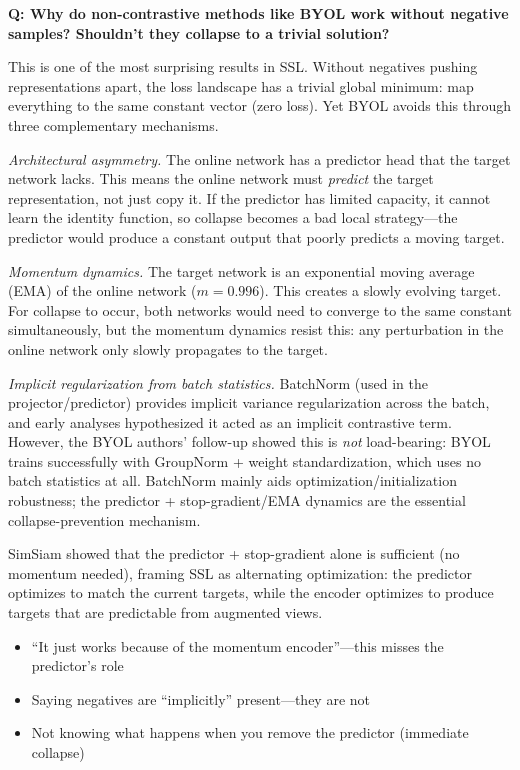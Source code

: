 \begin{interviewq}
\textbf{Q: Why do non-contrastive methods like BYOL work without negative samples? Shouldn't they collapse to a trivial solution?}

 \quad {} \quad \badgefreq{\freqhigh}

\stronganswer This is one of the most surprising results in SSL. Without negatives pushing representations apart, the loss landscape has a trivial global minimum: map everything to the same constant vector (zero loss). Yet BYOL avoids this through three complementary mechanisms.

\textit{Architectural asymmetry.} The online network has a predictor head that the target network lacks. This means the online network must \textit{predict} the target representation, not just copy it. If the predictor has limited capacity, it cannot learn the identity function, so collapse becomes a bad local strategy---the predictor would produce a constant output that poorly predicts a moving target.

\textit{Momentum dynamics.} The target network is an exponential moving average (EMA) of the online network ($m = 0.996$). This creates a slowly evolving target. For collapse to occur, both networks would need to converge to the same constant simultaneously, but the momentum dynamics resist this: any perturbation in the online network only slowly propagates to the target.

\textit{Implicit regularization from batch statistics.} BatchNorm (used in the projector/predictor) provides implicit variance regularization across the batch, and early analyses hypothesized it acted as an implicit contrastive term. However, the BYOL authors' follow-up showed this is \emph{not} load-bearing: BYOL trains successfully with GroupNorm + weight standardization, which uses no batch statistics at all. BatchNorm mainly aids optimization/initialization robustness; the predictor + stop-gradient/EMA dynamics are the essential collapse-prevention mechanism.

SimSiam showed that the predictor + stop-gradient alone is sufficient (no momentum needed), framing SSL as alternating optimization: the predictor optimizes to match the current targets, while the encoder optimizes to produce targets that are predictable from augmented views.

\redflags
\begin{itemize}
    \item ``It just works because of the momentum encoder''---this misses the predictor's role
    \item Saying negatives are ``implicitly'' present---they are not
    \item Not knowing what happens when you remove the predictor (immediate collapse)
\end{itemize}


\end{interviewq}
